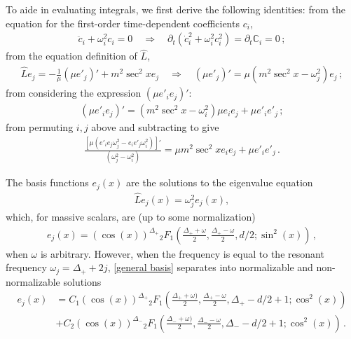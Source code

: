 \documentclass[letterpaper,11pt]{article}
\newcommand{\p}{\partial}
\newcommand{\oi}{\omega_i}
\newcommand{\oj}{\omega_j}
\begin{document}
To aide in evaluating integrals, we first derive the following identities: from the equation for the first-order time-dependent coefficients $c_i$,
\begin{align} 
\ddot c_i + \oi^2 c_i = 0 \quad \Rightarrow \quad \p_t \left(\dot c_i^2 + \oi^2 c_i^2 \right) = \p_t \mathbb C_i = 0 \, ;
\end{align}
from the equation definition of $\hat L$,
\begin{align}
\hat L e_j = -\frac{1}{\mu} \left( \mu e'_j \right)' + m^2 \sec^2 x e_j \quad \Rightarrow \quad \left( \mu e'_j \right)' = \mu \left( m^2 \sec^2 x - \omega_j^2 \right) e_j \, ;
\end{align}
from considering the expression $\left( \mu e'_i e_j \right)'$:
\begin{align}
\left( \mu e'_i e_j \right) ' = \left(m^2 \sec^2 x - \oi^2 \right) \mu e_i e_j + \mu e'_i e'_j \, ;
\end{align}
from permuting $i, j$ above and subtracting to give
\begin{align}
\frac{\left[ \mu (e'_i e_j \oj^2 - e_i e'_j \oi^2 ) \right]'}{(\oj^2 - \oi^2)} = \mu m^2 \sec^2 x e_i e_j + \mu e'_i e'_j \, .
\end{align}

The basis functions $e_j (x)$ are the solutions to the eigenvalue equation
\begin{align}
\hat L e_j(x) = \omega^2_j e_j(x) ,
\end{align}
which, for massive scalars, are (up to some normalization)
\begin{align}
\label{general basis}
e_j(x) = \left( \cos(x) \right)^{\Delta_+} {_2F_1} \left(\frac{\Delta_+ + \omega}{2}, \frac{\Delta_+ - \omega}{2}, d/2 ; \sin^2 (x) \right) \, ,
\end{align}
when $\omega$ is arbitrary. However, when the frequency is equal to the resonant frequency $\omega_j = \Delta_+ + 2j$, \eqref{general basis} separates into normalizable and non-normalizable solutions
\begin{align}
e_j(x) &= C_1 \left( \cos(x) \right)^{\Delta_+} {_2F_1}\left(\frac{\Delta_+ + \omega)}{2}, \frac{\Delta_+ - \omega}{2}, \Delta_+ -d/2 + 1 ; \cos^2 (x) \right) \nonumber \\
& + C_2 \left( \cos(x) \right)^{\Delta_-} {_2F_1} \left(\frac{\Delta_- + \omega)}{2}, \frac{\Delta_- - \omega}{2}, \Delta_- -d/2 + 1 ; \cos^2 (x) \right) \, .
\end{align}


\end{document}
